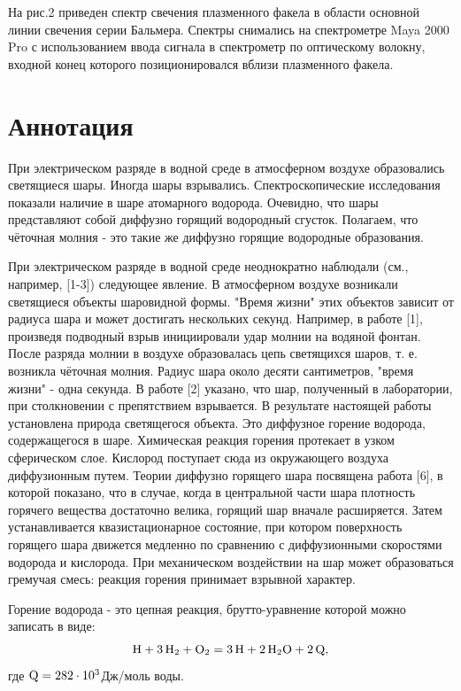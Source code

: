 \documentclass[a4paper]{article}
\begin{document}
На рис.2 приведен спектр свечения плазменного факела в области основной линии свечения серии Бальмера. Спектры снимались на спектрометре Maya 2000 Pro с использованием ввода сигнала в спектрометр по оптическому волокну, входной конец которого позиционировался вблизи плазменного факела.

\section{Аннотация}

При электрическом разряде в водной среде в атмосферном воздухе образовались светящиеся шары. Иногда шары взрывались. Спектроскопические исследования показали наличие в шаре атомарного водорода. Очевидно, что шары представляют собой диффузно горящий водородный сгусток. Полагаем, что чёточная молния - это такие же диффузно горящие водородные образования.

При электрическом разряде в водной среде неоднократно наблюдали (см., например, [1-3]) следующее явление. В атмосферном воздухе возникали светящиеся объекты шаровидной формы. "Время жизни" этих объектов зависит от радиуса шара и может достигать нескольких секунд. Например, в работе [1], произведя подводный взрыв инициировали удар молнии на водяной фонтан. После разряда молнии в воздухе образовалась цепь светящихся шаров, т. е. возникла чёточная молния. Радиус шара около десяти сантиметров, "время жизни" - одна секунда. В работе [2] указано, что шар, полученный в лаборатории, при столкновении с препятствием взрывается. В результате настоящей работы установлена природа светящегося объекта. Это диффузное горение водорода, содержащегося в шаре. Химическая реакция горения протекает в узком сферическом слое. Кислород поступает сюда из окружающего воздуха диффузионным путем. Теории диффузно горящего шара посвящена работа [6], в которой показано, что в случае, когда в центральной части шара плотность горячего вещества достаточно велика, горящий шар вначале расширяется. Затем устанавливается квазистационарное состояние, при котором поверхность горящего шара движется медленно по сравнению с диффузионными скоростями водорода и кислорода. При механическом воздействии на шар может образоваться гремучая смесь: реакция горения принимает взрывной характер.

Горение водорода - это цепная реакция, брутто-уравнение которой можно записать в виде:
\begin{equation} \label{eq:1}
\ce{H} + \ce{3H2} + \ce{O2} = \ce{3H} + \ce{2H2O} + \ce{2Q},    
\end{equation}
где \(\ce{Q} = 282\cdot10^3\)Дж/моль воды.
\end{document}
